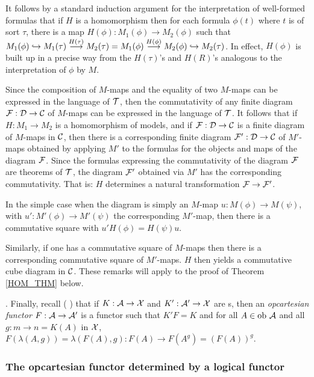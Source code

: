 \NI It follows by a standard induction argument for the 
interpretation of well-formed formulas that if $H$ is a homomorphism 
then for each formula $\phi(t)$ where $t$ is of sort $\tau$, there is 
a map $H(\phi) : M_1(\phi) \to M_2(\phi)$ such that $M_1(\phi) \hookrightarrow 
M_1(\tau) \stackrel{H(\tau)}{\longrightarrow} M_2(\tau) = M_1(\phi) 
\stackrel{H(\phi)}{\longrightarrow} M_2(\phi) \hookrightarrow M_2(\tau)$. In 
effect, $H(\phi)$ is built up in a precise way from the $H(\tau)$'s 
and $H(R)$'s analogous to the interpretation of $\phi$ by $M$. 

Since the composition of $M$-maps and the equality of two $M$-maps 
can be expressed in the language of $\cal T$, then the commutativity 
of any finite diagram $\cal F : {{\bf \cal D}} \to {{\bf \cal C}}$ of $M$-maps can 
be expressed in the language of $\cal T$. It follows that if $H : M_1 
\to M_2$ is a homomorphism of models, and if $\cal F : {{\bf \cal D}} \to 
{{\bf \cal C}}$ is a finite diagram of $M$-maps in ${\bf \cal C}$, then there is a 
corresponding finite diagram $\cal F' : {{\bf \cal D}} \to {{\bf \cal C}}$ of 
$M'$-maps obtained by applying $M'$ to the formulas for the objects 
and maps of the diagram $\cal F$. Since the formulas expressing the 
commutativity of the diagram $\cal F$ are theorems of $\cal T$, the 
diagram $\cal F'$ obtained via $M'$ has the corresponding 
commutativity. That is: $H$ determines a natural transformation $\cal 
F \to \cal F'$. 

In the simple case when the diagram is simply an $M$-map $u : M(\phi) 
\to M(\psi)$, with $u' : M'(\phi) \to M'(\psi)$ the corresponding 
$M'$-map, then there is a commutative square with $u' H(\phi) = 
H(\psi) u$.

Similarly, if one has a commutative square of $M$-maps then there is 
a corresponding commutative square of $M'$-maps. $H$ then yields a 
commutative cube diagram in ${\bf \cal C}$. These remarks will apply to the 
proof of Theorem \ref{HOM_THM} below.\medskip 

. Finally, recall (\cite{BarrWells} 
\cite{Grothen}) that if $K : {\bf \cal A} \to {\bf \cal X}$ and $K' : {\bf \cal A}' \to 
{\bf \cal X}$ are \SOF s, then an {\em opcartesian functor} $F : {\bf \cal A} \to 
{\bf \cal A}'$ is a functor such that $K' F = K$ and for all $A \in \mbox{ob 
} {\bf \cal A}$ and all $g : m \to n = K(A)$ in ${\bf \cal X}$, $F(\lambda(A,g)) = 
\lambda(F(A),g) : F(A) \to F(A^g) = (F(A))^g$. 

\subsubsection{The opcartesian functor determined by a logical 
functor} \label{F_OF_FM}


